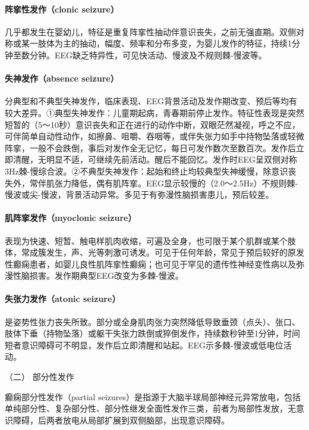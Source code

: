 \paragraph{阵挛性发作（clonic seizure）}

几乎都发生在婴幼儿，特征是重复阵挛性抽动伴意识丧失，之前无强直期。双侧对称或某一肢体为主的抽动，幅度、频率和分布多变，为婴儿发作的特征，持续1分钟至数分钟。EEG缺乏特异性，可见快活动、慢波及不规则棘-慢波等。

\paragraph{失神发作（absence seizure）}

分典型和不典型失神发作，临床表现、EEG背景活动及发作期改变、预后等均有较大差异。①典型失神发作：儿童期起病，青春期前停止发作。特征性表现是突然短暂的（5～10秒）意识丧失和正在进行的动作中断，双眼茫然凝视，呼之不应，可伴简单自动性动作，如擦鼻、咀嚼、吞咽等，或伴失张力如手中持物坠落或轻微阵挛，一般不会跌倒，事后对发作全无记忆，每日可发作数次至数百次。发作后立即清醒，无明显不适，可继续先前活动。醒后不能回忆。发作时EEG呈双侧对称3Hz棘-慢综合波。②不典型失神发作：起始和终止均较典型失神缓慢，除意识丧失外，常伴肌张力降低，偶有肌阵挛。EEG显示较慢的（2.0～2.5Hz）不规则棘-慢波或尖-慢波，背景活动异常。多见于有弥漫性脑损害患儿，预后较差。

\paragraph{肌阵挛发作（myoclonic seizure）}

表现为快速、短暂、触电样肌肉收缩，可遍及全身，也可限于某个肌群或某个肢体，常成簇发生，声、光等刺激可诱发。可见于任何年龄，常见于预后较好的原发性癫痫患者，如婴儿良性肌阵挛性癫痫；也可见于罕见的遗传性神经变性病以及弥漫性脑损害。发作期典型EEG改变为多棘-慢波。

\paragraph{失张力发作（atonic seizure）}

是姿势性张力丧失所致。部分或全身肌肉张力突然降低导致垂颈（点头）、张口、肢体下垂（持物坠落）或躯干失张力跌倒或猝倒发作，持续数秒钟至1分钟，时间短者意识障碍可不明显，发作后立即清醒和站起。EEG示多棘-慢波或低电位活动。

\hypertarget{text00245.htmlux5cux23CHP8-2-2-2-2}{}
（二） 部分性发作

癫痫部分性发作（partial
seizures）是指源于大脑半球局部神经元异常放电，包括单纯部分性、复杂部分性、部分性继发全面性发作三类，前者为局部性发放，无意识障碍，后两者放电从局部扩展到双侧脑部，出现意识障碍。

